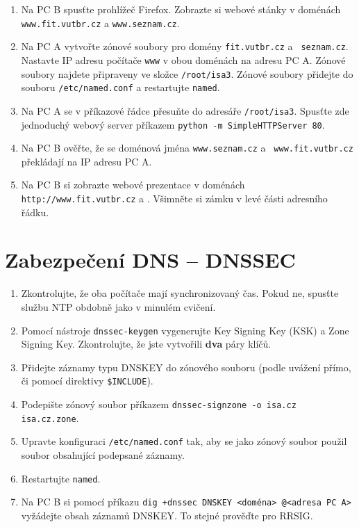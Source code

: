 \begin{enumerate}
  \item Na PC B spusťte prohlížeč Firefox. Zobrazte si webové stánky v
    doménách {\tt www.fit.vutbr.cz} a {\tt www.seznam.cz}.

  \item Na PC A vytvořte zónové soubory pro domény {\tt fit.vutbr.cz} a {\tt
    seznam.cz}. Nastavte IP adresu počítače {\tt www} v obou doménách na adresu
    PC A. Zónové soubory najdete připraveny ve složce {\tt /root/isa3}. Zónové
    soubory přidejte do souboru {\tt /etc/named.conf} a restartujte
    {\tt named}.

  \item Na PC A se v příkazové řádce přesuňte do adresáře {\tt /root/isa3}.
    Spusťte zde jednoduchý webový server příkazem {\tt python -m
    SimpleHTTPServer 80}.

  \item Na PC B ověřte, že se doménová jména {\tt www.seznam.cz} a {\tt
    www.fit.vutbr.cz} překládají na IP adresu PC A.

  \item Na PC B si zobrazte webové prezentace v doménách {\tt http://www.fit.vutbr.cz}
    a . Všimněte si zámku v levé části adresního řádku.

\end{enumerate}

\section{Zabezpečení DNS -- DNSSEC}

\begin{enumerate}

  \item Zkontrolujte, že oba počítače mají synchronizovaný čas. Pokud ne,
    spusťte službu NTP obdobně jako v minulém cvičení.

  \item Pomocí nástroje {\tt dnssec-keygen} vygenerujte Key Signing Key (KSK) a Zone Signing Key. Zkontrolujte, že
    jste vytvořili \textbf{dva} páry klíčů.

  \item Přidejte záznamy typu DNSKEY do zónového souboru (podle uvážení přímo,
    či pomocí direktivy \verb|$INCLUDE|).

  \item Podepište zónový soubor příkazem {\tt dnssec-signzone -o isa.cz isa.cz.zone}.
  
  \item Upravte konfiguraci {\tt /etc/named.conf} tak, aby se jako zónový
    soubor použil soubor obsahující podepsané záznamy. 

  \item Restartujte {\tt named}.

  \item Na PC B si pomocí příkazu {\tt dig +dnssec DNSKEY <doména> @<adresa PC A>} vyžádejte obsah záznamů
    DNSKEY. To stejné prověďte pro RRSIG.

\end{enumerate}


